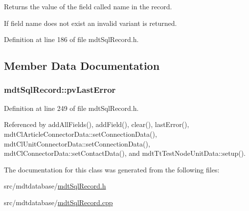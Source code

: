 Returns the value of the field called name in the record. 

If field name does not exist an invalid variant is returned. 

Definition at line 186 of file mdt\-Sql\-Record.\-h.



\subsection{Member Data Documentation}
\hypertarget{classmdt_sql_record_ae320a7933f4d5a002efc509c4c9c5a12}{
\subsubsection[{pv\-Last\-Error}]{ mdt\-Sql\-Record\-::pv\-Last\-Error\hspace{0.3cm}{\ttfamily [protected]}}}\label{classmdt_sql_record_ae320a7933f4d5a002efc509c4c9c5a12}


Definition at line 249 of file mdt\-Sql\-Record.\-h.



Referenced by add\-All\-Fields(), add\-Field(), clear(), last\-Error(), mdt\-Cl\-Article\-Connector\-Data\-::set\-Connection\-Data(), mdt\-Cl\-Unit\-Connector\-Data\-::set\-Connection\-Data(), mdt\-Cl\-Connector\-Data\-::set\-Contact\-Data(), and mdt\-Tt\-Test\-Node\-Unit\-Data\-::setup().



The documentation for this class was generated from the following files\-:\begin{DoxyCompactItemize}
\item 
src/mdtdatabase/\hyperlink{mdt_sql_record_8h}{mdt\-Sql\-Record.\-h}\item 
src/mdtdatabase/\hyperlink{mdt_sql_record_8cpp}{mdt\-Sql\-Record.\-cpp}\end{DoxyCompactItemize}
